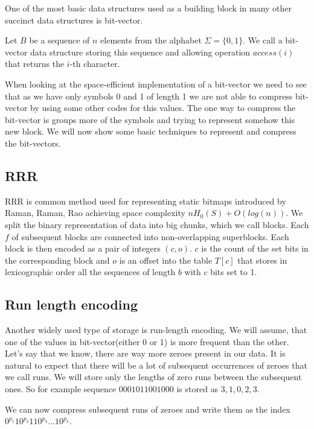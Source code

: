 One of the most basic data structures used as a building block in many other succinct data structures is bit-vector.

\begin{theorem}
Let $B$ be a sequence of $n$ elements from the alphabet $\Sigma = \{0, 1\}$. We call a bit-vector data structure storing this sequence
and allowing operation $access(i)$ that returns the $i$-th character.
\end{theorem}

When looking at the space-efficient implementation of a bit-vector we need to see that as we have only symbols 0 and 1 of length 1 we are not able to compress bit-vector by using some other codes for this values. The one way to compress the bit-vector is groups more of the symbols and trying to represent somehow this new block. We will now show some basic techniques to represent and compress the bit-vectors. 

\subsection{RRR}

RRR is common method used for representing static bitmaps introduced by Raman, Raman, Rao \cite{raman2007succinct} achieving space complexity $nH_0(S) + O(log(n))$. We split the binary representation of data into big chunks, which we call blocks.
Each $f$ of subsequent blocks are connected into non-overlapping superblocks. Each block is then encoded as a pair of integers $(c, o)$. $c$
is the count of the set bits in the corresponding block and $o$ is an offset into the table $T[c]$ that stores in lexicographic order all the sequences of
length $b$ with $c$ bits set to 1.

\subsection{Run length encoding}

Another widely used type of storage is run-length encoding. We will assume, that one of the values in bit-vector(either 0 or 1) is more frequent than the other. Let's say that we know, there are way more zeroes present in our data. It is natural to expect that there will be a lot of subsequent occurrences of zeroes that we call runs. We will store only the lengths of zero runs between the subsequent ones. So for example
sequence $0001011001000$ is stored as $3, 1, 0, 2, 3$.

We can now compress subsequent runs of zeroes and write them as the index $0^{p_1}10^{p_2}110^{p_3}\ldots 10^{p_k}$. 


